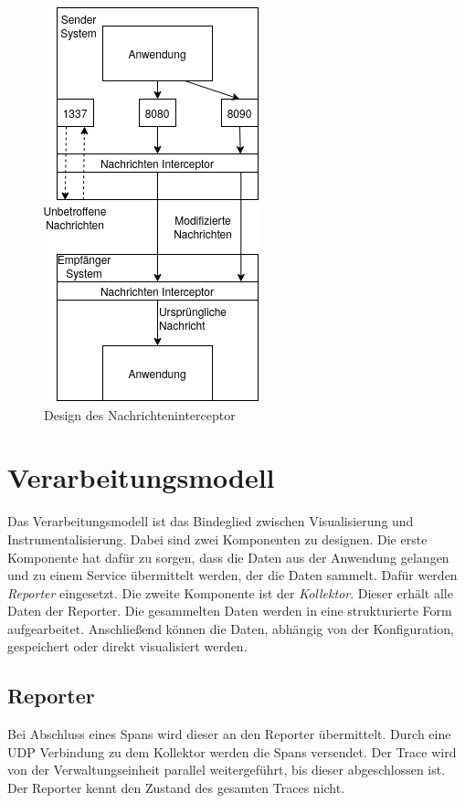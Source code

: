  \begin{figure}[!ht]
 	\centering
 	\includegraphics[scale=0.6]{img/Design/Nachrichteninterceptor.png}
 	\caption[Design des Nachrichteninterceptor]{Design des Nachrichteninterceptor}
 	\label{fig:Nachrichteninterceptor}
 \end{figure}

\section{Verarbeitungsmodell}
\label{section:Verarbeitungsmodell}
Das Verarbeitungsmodell ist das Bindeglied zwischen Visualisierung und Instrumentalisierung. Dabei sind zwei Komponenten zu designen. Die erste Komponente hat dafür zu sorgen, dass die Daten aus der Anwendung gelangen und zu einem Service übermittelt werden, der die Daten sammelt. Dafür werden \emph{Reporter} eingesetzt. Die zweite Komponente ist der \emph{Kollektor}. Dieser erhält alle Daten der Reporter. Die gesammelten Daten werden in eine strukturierte Form aufgearbeitet. Anschließend können die Daten, abhängig von der Konfiguration, gespeichert oder direkt visualisiert werden.

\subsection{Reporter}
\label{subsection:Reporter}
Bei Abschluss eines Spans wird dieser an den Reporter übermittelt. Durch eine UDP Verbindung zu dem Kollektor werden die Spans versendet. Der Trace wird von der Verwaltungseinheit parallel weitergeführt, bis dieser abgeschlossen ist. Der Reporter kennt den Zustand des gesamten Traces nicht. 

